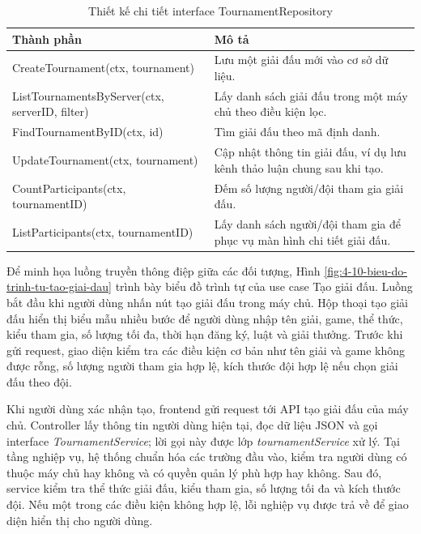 \begin{table}[H]
    \centering
    \caption{Thiết kế chi tiết interface TournamentRepository}
    \label{tab:4-4-thiet-ke-lop-tournament-repository}
    \begin{tabular}{|p{}|p{}|}
        \hline
        \textbf{Thành phần} & \textbf{Mô tả} \\ \hline
        CreateTournament(ctx, tournament) & Lưu một giải đấu mới vào cơ sở dữ liệu. \\ \hline
        ListTournamentsByServer(ctx, serverID, filter) & Lấy danh sách giải đấu trong một máy chủ theo điều kiện lọc. \\ \hline
        FindTournamentByID(ctx, id) & Tìm giải đấu theo mã định danh. \\ \hline
        UpdateTournament(ctx, tournament) & Cập nhật thông tin giải đấu, ví dụ lưu kênh thảo luận chung sau khi tạo. \\ \hline
        CountParticipants(ctx, tournamentID) & Đếm số lượng người/đội tham gia giải đấu. \\ \hline
        ListParticipants(ctx, tournamentID) & Lấy danh sách người/đội tham gia để phục vụ màn hình chi tiết giải đấu. \\ \hline
    \end{tabular}
\end{table}

Để minh họa luồng truyền thông điệp giữa các đối tượng, Hình \ref{fig:4-10-bieu-do-trinh-tu-tao-giai-dau} trình bày biểu đồ trình tự của use case Tạo giải đấu. Luồng bắt đầu khi người dùng nhấn nút tạo giải đấu trong máy chủ. Hộp thoại tạo giải đấu hiển thị biểu mẫu nhiều bước để người dùng nhập tên giải, game, thể thức, kiểu tham gia, số lượng tối đa, thời hạn đăng ký, luật và giải thưởng. Trước khi gửi request, giao diện kiểm tra các điều kiện cơ bản như tên giải và game không được rỗng, số lượng người tham gia hợp lệ, kích thước đội hợp lệ nếu chọn giải đấu theo đội.

Khi người dùng xác nhận tạo, frontend gửi request tới API tạo giải đấu của máy chủ. Controller lấy thông tin người dùng hiện tại, đọc dữ liệu JSON và gọi interface \textit{TournamentService}; lời gọi này được lớp \textit{tournamentService} xử lý. Tại tầng nghiệp vụ, hệ thống chuẩn hóa các trường đầu vào, kiểm tra người dùng có thuộc máy chủ hay không và có quyền quản lý phù hợp hay không. Sau đó, service kiểm tra thể thức giải đấu, kiểu tham gia, số lượng tối đa và kích thước đội. Nếu một trong các điều kiện không hợp lệ, lỗi nghiệp vụ được trả về để giao diện hiển thị cho người dùng.


